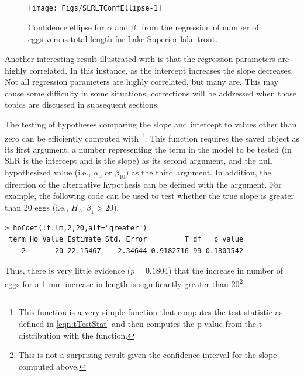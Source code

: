 \documentclass[10pt,openany]{book}\usepackage[]{graphicx}\usepackage[]{color}
\makeatletter
\newenvironment{kframe}{%
 \def\at@end@of@kframe{}%
 \ifinner\ifhmode%
  \def\at@end@of@kframe{\end{minipage}}%
  \begin{minipage}{\columnwidth}%
 \fi\fi%
 \def\FrameCommand##1{\hskip\@totalleftmargin \hskip-\fboxsep
 \colorbox{shadecolor}{##1}\hskip-\fboxsep
     \hskip-\linewidth \hskip-\@totalleftmargin \hskip\columnwidth}%
 \MakeFramed {\advance\hsize-\width
   \@totalleftmargin\z@ \linewidth\hsize
   \@setminipage}}%
 {\par\unskip\endMakeFramed%
 \at@end@of@kframe}
\newenvironment{knitrout}{}{} %
\makeatother
\begin{document}
\begin{knitrout}
\color{fgcolor}\begin{figure}[h]

{\centering \texttt{[image: Figs/SLRLTConfEllipse-1]} 

}

\caption[Confidence ellipse for ]{Confidence ellipse for $\alpha$ and $\beta_{1}$ from the regression of number of eggs versus total length for Lake Superior lake trout.}\label{fig:SLRLTConfEllipse}
\end{figure}


\end{knitrout}
\vspace{9pt}
Another interesting result illustrated with  is that the regression parameters are highly correlated.  In this instance, as the intercept increases the slope decreases.  Not all regression parameters are highly correlated, but many are.  This may cause some difficulty in some situations; corrections will be addressed when those topics are discussed in subsequent sections.

The testing of hypotheses comparing the slope and intercept to values other than zero can be efficiently computed with \footnote{This function is a very simple function that computes the test statistic as defined in \eqref{eqn:tTestStat} and then computes the p-value from the t-distribution with the  function.}.  This function requires the saved  object as its first argument, a number representing the term in the model to be tested (in SLR  is the intercept and  is the slope) as its second argument, and the null hypothesized value (i.e., $\alpha_{0}$ or $\beta_{10}$) as the third argument.  In addition, the direction of the alternative hypothesis can be defined with the  argument.  For example, the following code can be used to test whether the true slope is greater than 20 eggs (i.e.,  $H_{A}: \beta_{1}>20$),

\begin{knitrout}
\color{fgcolor}\begin{kframe}
\begin{verbatim}
> hoCoef(lt.lm,2,20,alt="greater")
 term Ho Value Estimate Std. Error         T df   p value
    2       20 22.15467    2.34644 0.9182716 99 0.1803542
\end{verbatim}
\end{kframe}
\end{knitrout}
Thus, there is very little evidence ($p=0.1804$) that the increase in number of eggs for a 1 mm increase in length is significantly greater than 20\footnote{This is not a surprising result given the confidence interval for the slope computed above.}.
\end{document}
